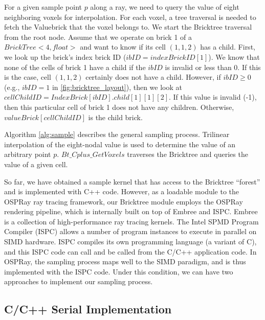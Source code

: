 For a given sample point $p$ along a ray, we need to query the value of eight
neighboring voxels for interpolation. For each voxel, a tree traversal
is needed to fetch the Valuebrick that the voxel belongs to. We start the Bricktree
traversal from the root node. Assume that we operate on brick 1 of a 
$BrickTree<4,float>$ and want to know if its cell $(1,1,2)$ has a child.
First, we look up the brick's index brick ID ($ibID = indexBrickID[1]$).
We know that none of the cells of brick 1 have a child if the $ibID$
is invalid or less than 0. If this is the case, cell $(1,1,2)$ certainly does not have a child.
However, if $ibID \geq 0$ (e.g., $ibID = 1$ in \autoref{fig:bricktree_layout}), 
then we look at $cellChildID = IndexBrick[ibID].child[1][1][2]$. 
If this value is invalid (-1), then this particular cell of brick 1 does not have any
children. Otherwise, $valueBrick[cellChildID]$ is the child brick.

Algorithm \ref{alg:sample} describes the general sampling process. 
Trilinear interpolation of the eight-nodal value is used to determine the value of an 
arbitrary point $p$. $Bt\_Cplus\_GetVoxels$ traverses the Bricktree and queries the 
value of a given cell. 

So far, we have obtained a sample kernel that has access to the Bricktree ``forest'' and is 
implemented with C++ code. However, as a loadable module to the OSPRay ray tracing
framework, our Bricktree module employs the OSPRay rendering pipeline, which is internally
built on top of Embree\cite{wald2014embree} and ISPC\cite{pharr2012ispc}. Embree is
a collection of high-performance ray tracing kernels. 
The Intel SPMD Program Compiler (ISPC) allows a number of program instances
to execute in parallel on SIMD hardware. ISPC compiles its own programming language
(a variant of C), and this ISPC code can call and be called from the C/C++ application code.
In OSPRay, the sampling process maps well to the SIMD paradigm, and is thus implemented
with the ISPC code. Under this condition, we can have two approaches to implement our
sampling process. 



\subsection{C/C++ Serial Implementation}

